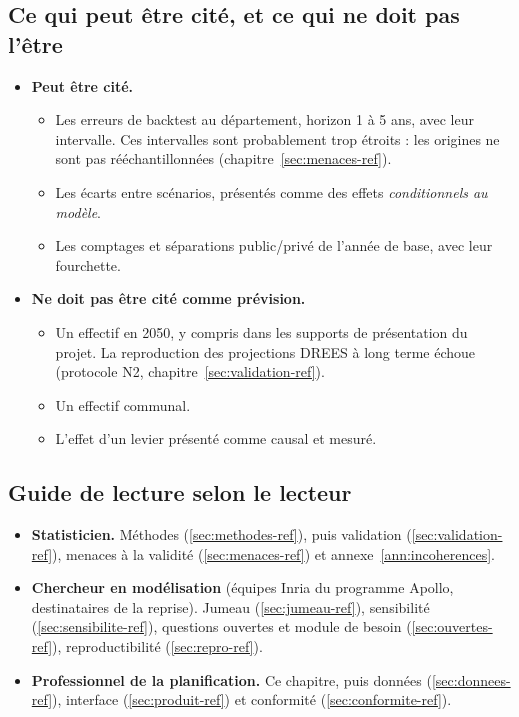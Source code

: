 \subsection{Ce qui peut être cité, et ce qui ne doit pas l'être}\label{int:citer}
\begin{itemize}
\item \textbf{Peut être cité.}
  \begin{itemize}
  \item Les erreurs de backtest au département, horizon 1 à 5 ans, avec leur intervalle. Ces intervalles sont
    probablement trop étroits : les origines ne sont pas rééchantillonnées (chapitre~\ref{sec:menaces-ref}).
  \item Les écarts entre scénarios, présentés comme des effets \emph{conditionnels au modèle}.
  \item Les comptages et séparations public/privé de l'année de base, avec leur fourchette.
  \end{itemize}
\item \textbf{Ne doit pas être cité comme prévision.}
  \begin{itemize}
  \item Un effectif en 2050, y compris dans les supports de présentation du projet. La reproduction des
    projections DREES à long terme échoue (protocole N2, chapitre~\ref{sec:validation-ref}).
  \item Un effectif communal.
  \item L'effet d'un levier présenté comme causal et mesuré.
  \end{itemize}
\end{itemize}

\subsection{Guide de lecture selon le lecteur}
\begin{itemize}
\item \textbf{Statisticien.} Méthodes (\ref{sec:methodes-ref}), puis validation (\ref{sec:validation-ref}),
  menaces à la validité (\ref{sec:menaces-ref}) et annexe~\ref{ann:incoherences}.
\item \textbf{Chercheur en modélisation} (équipes Inria du programme Apollo, destinataires de la reprise). Jumeau (\ref{sec:jumeau-ref}), sensibilité
  (\ref{sec:sensibilite-ref}), questions ouvertes et module de besoin (\ref{sec:ouvertes-ref}), reproductibilité
  (\ref{sec:repro-ref}).
\item \textbf{Professionnel de la planification.} Ce chapitre, puis données (\ref{sec:donnees-ref}), interface
  (\ref{sec:produit-ref}) et conformité (\ref{sec:conformite-ref}).
\end{itemize}

